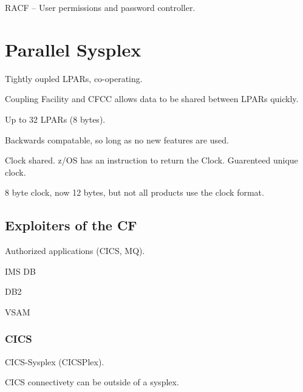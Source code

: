 \documentclass{report}
\begin{document}
RACF -- User permissions and password controller.

\section{Parallel Sysplex}
Tightly oupled LPARs, co-operating.

Coupling Facility and CFCC allows data to be shared between LPARs quickly.

Up to 32 LPARs (8 bytes).

Backwards compatable, so long as no new features are used.

Clock shared. z/OS has an instruction to return the Clock. Guarenteed unique clock.

8 byte clock, now 12 bytes, but not all products use the clock format.

\subsection{Exploiters of the CF}

Authorized applications (CICS, MQ).

IMS DB

DB2

VSAM

\subsubsection{CICS}

CICS-Sysplex (CICSPlex).

CICS connectivety can be outside of a sysplex.
\end{document}
